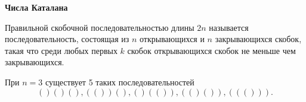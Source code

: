 \documentclass{article}
\begin{document}
    \large
    \begin{center}
        \textbf{Числа Каталана}
    \end{center}

    \begin{definition}
        Правильной скобочной последовательностью длины $2n$ называется
        последовательность, состоящая из $n$ открывающихся и $n$ закрывающихся скобок,
        такая что среди любых первых $k$ скобок открывающихся скобок не меньше чем
        закрывающихся.
    \end{definition}

    \begin{example}
        При $n = 3$ существует 5 таких последовательностей \[()()(), (())(), ()(()), (()()), ((())).\]
    \end{example}
\end{document}
